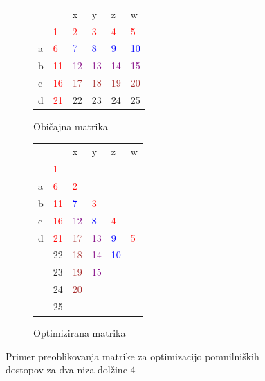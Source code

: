 \documentclass[a4paper,12pt,openright]{book}
\begin{document}
\begin{figure}[htb]

\begin{subfigure}{.5\textwidth}
\centering
\begin{tabular}{|l|l|l|l|l|l|}
\cline{3-6}
  \multicolumn{2}{c|}{}  & x & y & z & w\\ \cline{2-6}
 \multicolumn{1}{c|}{} & \textcolor{red}{1} & \textcolor{red}{2} & \textcolor{red}{3} & \textcolor{red}{4} & \textcolor{red}{5}\\ \hline
a  & \textcolor{red}{6} & \textcolor{blue}{7} & \textcolor{blue}{8} & \textcolor{blue}{9} & \textcolor{blue}{10}\\ \hline
b  & \textcolor{red}{11} & \textcolor{purple}{12} & \textcolor{purple}{13} & \textcolor{purple}{14} & \textcolor{purple}{15}\\ \hline
c  & \textcolor{red}{16} & \textcolor{brown}{17} & \textcolor{brown}{18} & \textcolor{brown}{19} & \textcolor{brown}{20} \\ \hline
d  & \textcolor{red}{21} & 22 & 23 & 24 & 25 \\ \hline
\end{tabular}
\caption{Običajna matrika}
\label{normalMatrix}
\end{subfigure}%
\begin{subfigure}{.5\textwidth}
\centering
\begin{tabular}{|l|l|l|l|l|l|}
\cline{3-6}
  \multicolumn{2}{c|}{}  & x & y & z & w \\ \cline{2-6}
 \multicolumn{1}{c|}{} & \textcolor{red}{1} & \multicolumn{4}{c}{} \\ \cline{1-3}
a  & \textcolor{red}{6} & \textcolor{red}{2} &  \multicolumn{3}{c}{} \\ \cline{1-4}
b  & \textcolor{red}{11} & \textcolor{blue}{7} & \textcolor{red}{3} & \multicolumn{2}{c}{}  \\ \cline{1-5}
c  & \textcolor{red}{16} & \textcolor{purple}{12} & \textcolor{blue}{8} & \textcolor{red}{4} & \multicolumn{1}{c}{} \\ \cline{1-6}
d  & \textcolor{red}{21} & \textcolor{brown}{17} & \textcolor{purple}{13} & \textcolor{blue}{9} & \textcolor{red}{5} \\ \hline
 \multicolumn{1}{c|}{} & 22 & \textcolor{brown}{18} & \textcolor{purple}{14} & \textcolor{blue}{10} & \multicolumn{1}{c}{}  \\ \cline{2-5}
\multicolumn{1}{c|}{}  & 23 & \textcolor{brown}{19} & \textcolor{purple}{15} & \multicolumn{2}{c}{}   \\ \cline{2-4}
\multicolumn{1}{c|}{}  & 24 & \textcolor{brown}{20} &  \multicolumn{3}{c}{}   \\ \cline{2-3}
\multicolumn{1}{c|}{}  & 25 & \multicolumn{4}{c}{}  \\ \cline{2-2}
\end{tabular}
\caption{Optimizirana matrika}
\label{diagonalMatrix}
\end{subfigure}%

\caption{Primer preoblikovanja matrike za optimizacijo pomnilniških dostopov za dva niza dolžine 4}
\label{matrixTransformation}
\end{figure}
\end{document}
